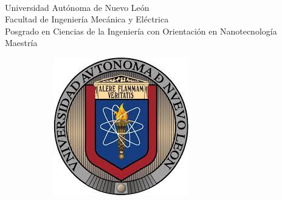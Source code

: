 \documentclass[letterpaper, 10 pt, conference]{article}
\begin{document}
\thispagestyle{empty}
\vspace{10 cm}
\begin{scshape}
\begin{center}
	{$\,$} \\[20 mm]
	{\Large{Universidad Autónoma de Nuevo León}} \\[5mm]
	{\large{Facultad de Ingeniería Mecánica y Eléctrica}} \\[5mm]
	{\large{Posgrado en Ciencias de la Ingeniería con Orientación en Nanotecnología}} \\[5 mm]
	{\large{Maestría}}
	\vskip16mm
	\begin{figure}[h!]
		\centering
		\begin{subfigure}{0.3\linewidth}
			\includegraphics[width=\linewidth]{uanl}
		\end{subfigure}
		\hspace{15 mm}
		\begin{subfigure}{0.2\linewidth}

\end{subfigure}
\end{figure}
\end{center}
\end{scshape}
\end{document}
